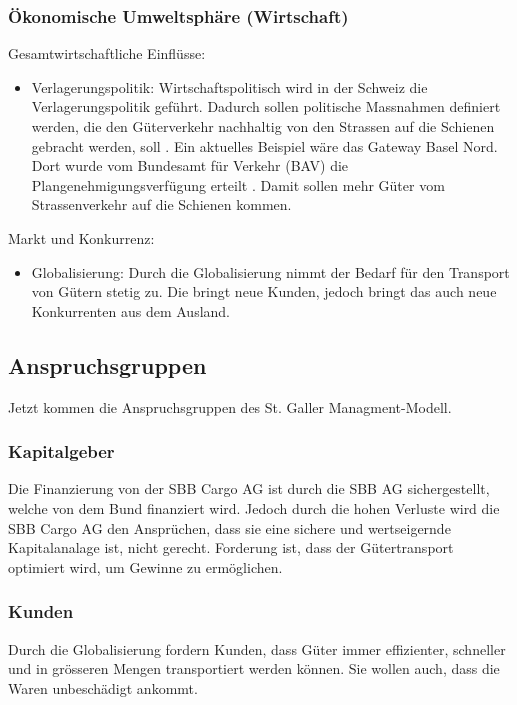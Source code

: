 \documentclass{article}
\begin{document}
\subsubsection{Ökonomische Umweltsphäre (Wirtschaft)}
Gesamtwirtschaftliche Einflüsse:
\begin{itemize}
    \item Verlagerungspolitik:
    Wirtschaftspolitisch wird in der Schweiz die Verlagerungspolitik geführt.
    Dadurch sollen politische Massnahmen definiert werden, die den Güterverkehr nachhaltig von den Strassen auf die Schienen gebracht werden, soll \parencite[o. S.]{verlagerungspolitik}.
    Ein aktuelles Beispiel wäre das Gateway Basel Nord.
    Dort wurde vom Bundesamt für Verkehr (BAV) die Plangenehmigungsverfügung erteilt \parencite[o. S.]{gatewayBasel}.
    Damit sollen mehr Güter vom Strassenverkehr auf die Schienen kommen.
\end{itemize}
Markt und Konkurrenz:
\begin{itemize}
    \item Globalisierung:
    Durch die Globalisierung nimmt der Bedarf für den Transport von Gütern stetig zu.
    Die bringt neue Kunden, jedoch bringt das auch neue Konkurrenten aus dem Ausland. 
\end{itemize}

\subsection{Anspruchsgruppen}

Jetzt kommen die Anspruchsgruppen des St. Galler Managment-Modell.

\subsubsection{Kapitalgeber}
Die Finanzierung von der SBB Cargo AG ist durch die SBB AG sichergestellt, welche von dem Bund finanziert wird.
Jedoch durch die hohen Verluste wird die SBB Cargo AG den Ansprüchen, dass sie eine sichere und wertseigernde Kapitalanalage ist, nicht gerecht.
Forderung ist, dass der Gütertransport optimiert wird, um Gewinne zu ermöglichen.

\subsubsection{Kunden}
Durch die Globalisierung fordern Kunden, dass Güter immer effizienter, schneller und in grösseren Mengen transportiert werden können.
Sie wollen auch, dass die Waren unbeschädigt ankommt.
\end{document}
